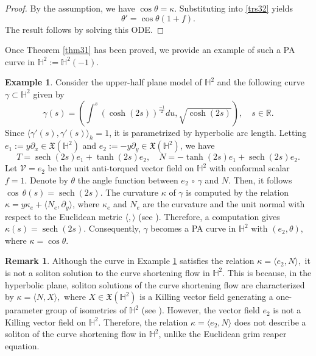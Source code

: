 \documentclass[12pt]{amsart}
\def\r{\mathbb R}
\def\h{\mathbb H}
\def\v{\mathcal V}
\def\x{\mathfrak X}
\DeclareMathOperator{\sech}{sech}
\theoremstyle{definition}
\newtheorem{example}[theorem]{Example}
\newtheorem{remark}[theorem]{Remark}
\begin{document}
\begin{proof}
By the assumption, we have $\cos \theta=\kappa$. Substituting into \eqref{trs32} yields
$$
\theta'=\cos \theta (1+f  ).
$$
The result follows by solving this ODE.
\end{proof}

Once Theorem \ref{thm31} has been proved, we provide an example of such a PA curve in $\h^2:=\h^2(-1)$. 

\begin{example} \label{examp45}
Consider the upper-half plane model of $\h^2$ and the following curve $\gamma \subset \h^2$  given by
$$
\gamma(s)=\left (\int^s(\cosh(2s))^{\frac{-1}{2}}du, \sqrt{\cosh(2s)}\right ), \quad s\in \r.
$$
Since $\langle\gamma'(s),\gamma'(s)\rangle_h=1$, it is parametrized by hyperbolic arc length. Letting $e_1:=y\partial_x\in \x(\h^2)$ and $e_2:=-y\partial_y\in \x(\h^2)$, we have
$$
T=\sech(2s) e_1+\tanh(2s) e_2, \quad N=-\tanh(2s) e_1+\sech(2s) e_2.
$$
Let $\v=e_2$ be the unit anti-torqued vector field on $\h^2$ with conformal scalar $f=1$. Denote by $\theta $ the angle function between $e_2\,\circ \,\gamma$ and $N$. Then, it follows $\cos \,\theta(s)=\sech(2s)$. The curvature $\kappa$ of $\gamma$ is computed by the relation $\kappa=y\kappa_e+\langle N_e, \partial_y \rangle$, where $\kappa_e$ and $N_e$ are the curvature and the unit normal with respect to the Euclidean metric $\langle , \rangle$ (see \cite[Equation (4)]{kl}). Therefore, a computation gives $\kappa(s)=\sech(2s)$.  Consequently, $\gamma$ becomes a PA curve in $\h^2$ with $(e_2,\theta)$, where $ \kappa=\cos \theta$.
\end{example}

\begin{remark}
Although the curve in Example \ref{examp45} satisfies the relation $\kappa=\langle e_2,N\rangle,$
it is not a soliton solution to the curve shortening flow in $\h^2$. This is because, in the hyperbolic plane, soliton solutions of the curve shortening flow are characterized by $\kappa=\langle N,X\rangle,$
where $X\in \x(\h^2)$ is a Killing vector field generating a one-parameter group of isometries of $\h^2$ (see \cite{kl}). However, the vector field $e_2$ is not a Killing vector field on $\h^2$. Therefore, the relation $\kappa=\langle e_2,N\rangle$
does not describe a soliton of the curve shortening flow in $\h^2$, unlike the Euclidean grim reaper equation.
\end{remark}



\end{document}
